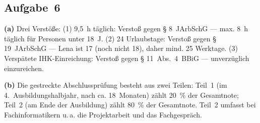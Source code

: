 \documentclass[11pt, a4paper]{article}
\begin{document}
\subsection*{Aufgabe~6}

\textbf{(a)} Drei Verstöße:
(1) 9,5~h täglich: Verstoß gegen § 8~JArbSchG --- max. 8~h täglich für Personen unter 18~J.
(2) 24 Urlaubstage: Verstoß gegen § 19~JArbSchG --- Lena ist 17 (noch nicht 18), daher mind. 25 Werktage.
(3) Verspätete IHK-Einreichung: Verstoß gegen § 11~Abs.~4~BBiG --- unverzüglich einzureichen.

\textbf{(b)} Die gestreckte Abschlussprüfung besteht aus zwei Teilen:
Teil~1 (im 4.~Ausbildungshalbjahr, nach ca. 18~Monaten) zählt 20~\% der Gesamtnote;
Teil~2 (am Ende der Ausbildung) zählt 80~\% der Gesamtnote.
Teil~2 umfasst bei Fachinformatikern u.\,a. die Projektarbeit und das Fachgespräch.
\end{document}
